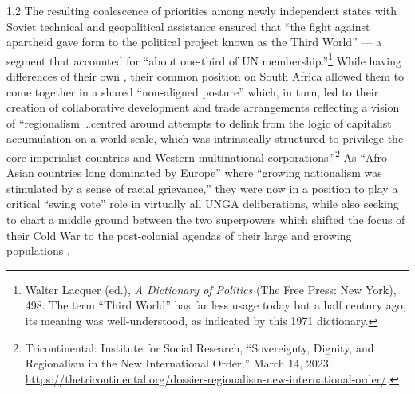 \documentclass[../unravbook.tex]{subfiles}
\begin{document}
\begin{spacing}{1.2}
The resulting coalescence of priorities among newly independent states with Soviet technical and geopolitical assistance ensured that \enquote{the fight against apartheid gave form to the political project known as the Third World} \parencite[5]{Irwin-2012} --- a segment that accounted for \enquote{about one-third of UN membership.}\footnote{Walter Lacquer (ed.), \textit{A Dictionary of Politics} (The Free Press: New York), 498. The term ``Third World'' has far less usage today but a half century ago, its meaning was well-understood, as indicated by this 1971 dictionary.} While having differences of their own \parencite[26]{Leiss-1965}, their common position on South Africa allowed them to come together in a shared ``non-aligned posture'' which, in turn, led to their creation of collaborative development and trade arrangements reflecting a vision of \enquote{regionalism \ldots centred around attempts to delink from the logic of capitalist accumulation on a world scale, which was intrinsically structured to privilege the core imperialist countries and Western multinational corporations.}\footnote{Tricontinental: Institute for Social Research, \enquote{Sovereignty, Dignity, and Regionalism in the New International Order,} March 14, 2023. \url{https://thetricontinental.org/dossier-regionalism-new-international-order/}.} As \enquote{Afro-Asian countries long dominated by Europe} where ``growing nationalism was stimulated by a sense of racial grievance,'' they were now in a position to play a critical ``swing vote'' role in virtually all UNGA deliberations, while also seeking to chart a middle ground between the two superpowers which shifted the focus of their Cold War to the post-colonial agendas of their large and growing populations \parencite[]{Westad-2016}.


\end{spacing}
\end{document}
